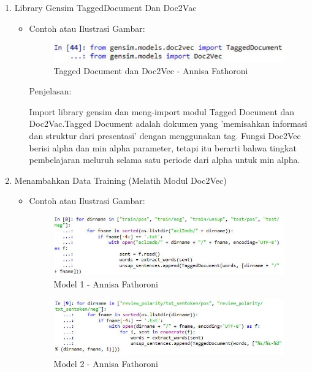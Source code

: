 \begin{enumerate}
\begin{itemize}
\end{itemize}

\item Library Gensim TaggedDocument Dan Doc2Vac
\begin{itemize}
\item Contoh atau Ilustrasi Gambar:

\begin{figure}[!hbtp]
\centering
\includegraphics[scale=0.7]{figures/Chapter5AnnisaFathoroni40.jpg}
\caption{Tagged Document dan Doc2Vec - Annisa Fathoroni}
\label{Tagged Document dan Doc2Vec - Annisa Fathoroni}
\end{figure}

Penjelasan:

Import library gensim dan meng-import modul Tagged Document dan Doc2Vac.Tagged Document adalah dokumen yang 'memisahkan informasi dan struktur dari presentasi' dengan menggunakan tag. Fungsi Doc2Vec berisi alpha dan min alpha parameter, tetapi itu berarti bahwa tingkat pembelajaran meluruh selama satu periode dari alpha untuk min alpha.

\end{itemize}

\item Menambahkan Data Training (Melatih Modul Doc2Vec)
\begin{itemize}
\item Contoh atau Ilustrasi Gambar:

\begin{figure}[!hbtp]
\centering
\includegraphics[scale=0.7]{figures/Chapter5AnnisaFathoroni42.jpg}
\caption{Model 1 - Annisa Fathoroni}
\label{Model 1 - Annisa Fathoroni}
\end{figure}

\begin{figure}[!hbtp]
\centering
\includegraphics[scale=0.7]{figures/Chapter5AnnisaFathoroni43.jpg}
\caption{Model 2 - Annisa Fathoroni}
\label{Model 2 - Annisa Fathoroni}
\end{figure}


\end{itemize}
\end{enumerate}
